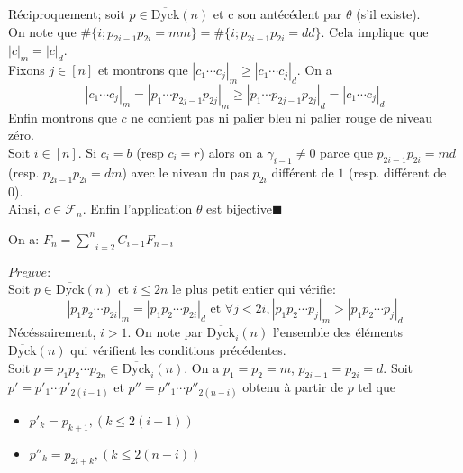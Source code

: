 Réciproquement; soit $p\in \overline{\text{Dyck}}(n) $ et c son antécédent par $\theta$	(s'il existe).\\ On note que $\#\{i; p_{2i-1}p_{2i}=mm\} = \#\{i; p_{2i-1}p_{2i}=dd\}$. Cela implique que $|c|_{m} = |c|_{d}$.\\
Fixons $j\in [n]$ et montrons que $| c_{1}\cdots c_{j} |_{m}\geq | c_{1}\cdots c_{j} |_{d}$. On a \vspace{5pt}
\[
	| c_{1}\cdots c_{j} |_{m} = |  p_{1}\cdots p_{2j-1}p_{2j} |_{m} \geq | p_{1}\cdots p_{2j-1}p_{2j} |_{d} = | c_{1}\cdots c_{j} |_{d}
\]
\text{}\vspace{5pt}
Enfin montrons que $c$ ne contient pas ni palier bleu ni palier rouge de niveau zéro. \\
Soit $i\in [n]$. Si $c_{i}=b$ (resp $c_{i}=r$) alors on a $\gamma_{i-1}\neq 0$ parce que $p_{2i-1}p_{2i}=md$ (resp. $p_{2i-1}p_{2i}=dm$) avec le niveau du pas $p_{2i}$ différent de $1$ (resp. différent de 0).\\
Ainsi, $c\in \mathcal{F}_{n}$. Enfin l'application $\theta$ est bijective\hspace{10pt}$\blacksquare$
\begin{proposition}
	On a: $ F_{n} = \underset{i=2}{\overset{n}{\sum}}C_{i-1}F_{n-i} $
\end{proposition}
$\underline{\textit{Preuve}}$:\\
Soit $p \in  \overline{\text{Dyck}}(n)$ et $i \leq 2n$ le plus petit entier qui vérifie:
$$|p_{1}p_{2}\cdots p_{2i}|_{m} = |p_{1}p_{2}\cdots p_{2i}|_{d} \text{ et } \forall j<2i, |p_{1}p_{2}\cdots p_{j}|_{m}>|p_{1}p_{2}\cdots p_{j}|_{d}$$
Nécéssairement, $i > 1$. On note par $\overline{\text{Dyck}}_{i}(n)$ l'ensemble des éléments $\overline{\text{Dyck}}(n)$ qui vérifient les conditions précédentes. \\
Soit $p=p_{1}p_{2}\cdots p_{2n} \in \overline{\text{Dyck}}_{i}(n)$. On a $p_{1} = p_{2} = m$,  $p_{2i-1} = p_{2i} = d$. Soit $p'=p'_{1}\cdots p'_{2(i-1)}$ et $p''=p''_{1} \cdots p''_{2(n-i)}$ obtenu à partir de $p$ tel que
\begin{itemize}
	\item $p'_{k}=p_{k+1}, (k\leq 2(i-1))$
	\item $p''_{k}=p_{2i+k}, (k\leq 2(n-i))$
\end{itemize}
